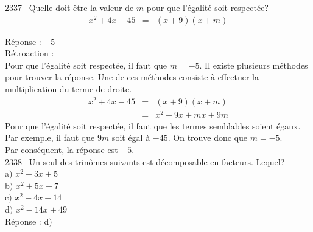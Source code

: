\documentclass[letterpaper, 12pt]{article}
\begin{document}
2337-- Quelle doit \^etre la valeur de $m$ pour que l'\'egalit\'e soit respect\'ee?\\
\begin{eqnarray*}
x^{2}+4x-45&=&(x+9)(x+m)
\end{eqnarray*}

R\'eponse : $-5$\\

R\'etroaction :\\
Pour que l'\'egalit\'e soit respect\'ee, il faut que $m=-5$. Il existe plusieurs m\'ethodes pour trouver la r\'eponse. Une de ces m\'ethodes consiste \`a effectuer la multiplication du terme de droite.
\begin{eqnarray*}
x^{2}+4x-45&=&(x+9)(x+m)\\
&=&x^{2}+9x+mx+9m
\end{eqnarray*}
Pour que l'\'egalit\'e soit respect\'ee, il faut que les termes semblables soient \'egaux. Par exemple, il faut que $9m$ soit \'egal \`a $-45$. On trouve donc que $m=-5$.\\
Par cons\'equent, la r\'eponse est $-5$.\\

2338-- Un seul des trin\^omes suivants est d\'ecomposable en facteurs. Lequel?\\

a$)$ $x^{2}+3x+5$\\
b$)$ $x^{2}+5x+7$\\
c$)$ $x^{2}-4x-14$\\
d$)$ $x^{2}-14x+49$\\

R\'eponse : d$)$\\
\end{document}
